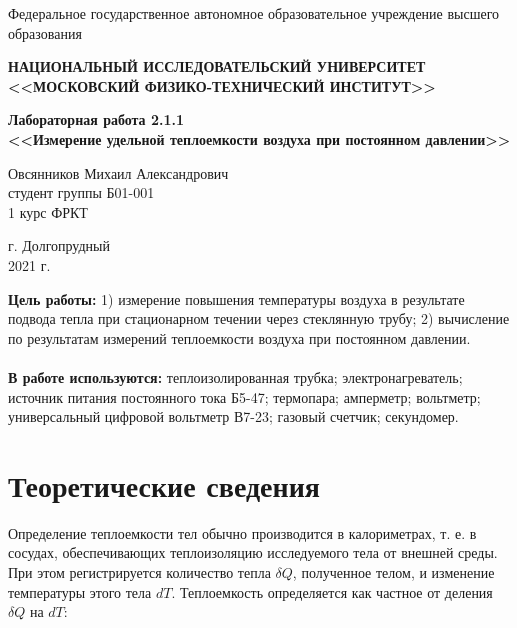 \documentclass[a4paper,12pt]{article} %
\begin{document}
	\begin{center}
		
		\normalsize{Федеральное государственное автономное образовательное учреждение высшего образования}
		
		\textbf{НАЦИОНАЛЬНЫЙ ИССЛЕДОВАТЕЛЬСКИЙ УНИВЕРСИТЕТ \\ <<МОСКОВСКИЙ ФИЗИКО-ТЕХНИЧЕСКИЙ ИНСТИТУТ>>}
		\vspace{13ex}
		
		\textbf{Лабораторная работа 2.1.1 \\ <<Измерение удельной теплоемкости воздуха при постоянном давлении>> }
		\vspace{40ex}
		
		\normalsize{Овсянников Михаил Александрович \\ студент группы Б01-001\\ 1 курс ФРКТ\\}
	\end{center}
	
	\vfill 
	
	\begin{center}
		г. Долгопрудный\\ 
		2021 г.
	\end{center}
	
	\thispagestyle{empty} %
	
	\newpage
	
	\textbf{Цель работы:} 1) измерение повышения температуры воздуха в результате подвода тепла при стационарном течении через стеклянную трубу; 2) вычисление по результатам измерений теплоемкости воздуха при постоянном давлении.
	\\
	\\
	\indent	\textbf{В работе используются:} теплоизолированная трубка; электронагреватель; источник питания постоянного тока Б5-47; термопара; амперметр; вольтметр; универсальный цифровой вольтметр В7-23; газовый счетчик; секундомер.
	
	\section*{Теоретические сведения}
Определение теплоемкости тел обычно производится в калориметрах, т. е. в сосудах, обеспечивающих теплоизоляцию исследуемого тела от внешней среды. При этом регистрируется количество тепла $\delta Q$, полученное телом, и изменение температуры этого тела $dT$. Теплоемкость определяется как частное от деления $\delta Q$ на $dT$:
\end{document}
